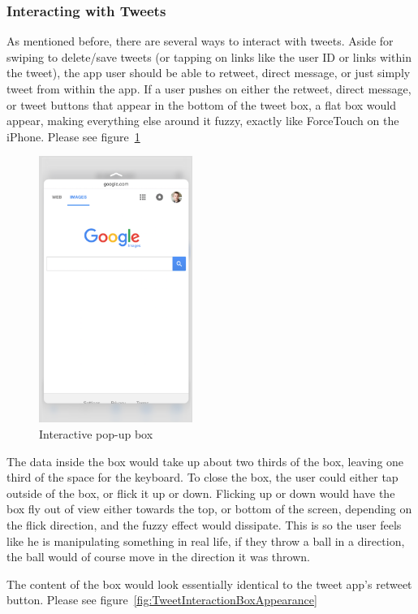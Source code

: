 \documentclass[11pt]{article}
\begin{document}
\subsubsection{Interacting with Tweets}
As mentioned before, there are several ways to interact with tweets. Aside for swiping to delete/save tweets (or tapping on links like the user ID or links within the tweet), the app user should be able to retweet, direct message, or just simply tweet from within the app. If a user pushes on either the retweet, direct message, or tweet buttons that appear in the bottom of the tweet box, a  flat box would appear, making everything else around it fuzzy, exactly like ForceTouch on the iPhone. Please see figure~\ref{fig:tweetInteraction}

\begin{figure}[H]
    \centering
    \includegraphics[width=5cm]{tweetInteractionImage}
    \caption{Interactive pop-up box}
    \label{fig:tweetInteraction}
\end{figure}

The data inside the box would take up about two thirds of the box, leaving one third of the space for the keyboard. To close the box, the user could either tap outside of the box, or flick it up or down. Flicking up or down would have the box fly out of view either towards the top, or bottom of the screen, depending on the flick direction, and the fuzzy effect would dissipate. This is so the user feels like he is manipulating something in real life, if they throw a ball in a direction, the ball would of course move in the direction it was thrown.

The content of the box would look essentially identical to the tweet app's retweet button. Please see figure~\ref{fig:TweetInteractionBoxAppearance}
\end{document}
